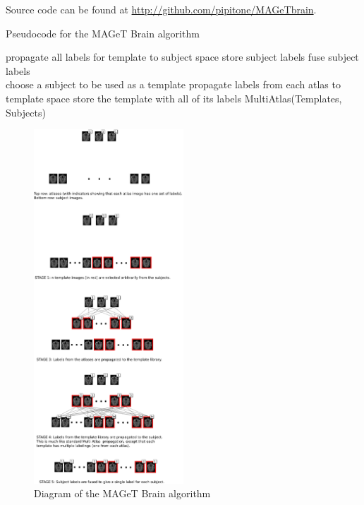 \documentclass{article}\usepackage{graphicx, color}
\begin{document}
Source code can be found at \url{http://github.com/pipitone/MAGeTbrain}.

\begin{algorithm}
\caption{Pseudocode for the MAGeT Brain algorithm}
\label{pseudocodesdf}
\begin{algorithmic}
      \State propagate all labels for template to subject space
      \State store subject labels
    \EndFor
    \State fuse subject labels
  \EndFor
\EndFunction
\\
    \State choose a subject to be used as a template
    \State propagate labels from each atlas to template space
    \State store the template with all of its labels
  \EndFor
  \State MultiAtlas(Templates, Subjects)
\EndFunction
\end{algorithmic}
\end{algorithm}

\begin{figure}[h]
  \centering
    \includegraphics[width=0.5\textwidth]{figure/MAGeT-figure.png}
  \caption{Diagram of the MAGeT Brain algorithm}
\end{figure}
\end{document}
